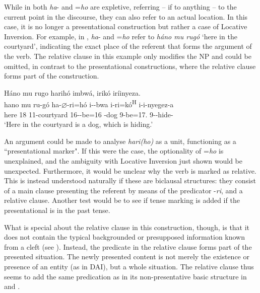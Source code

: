 \documentclass[output=paper]{langscibook}
\begin{document}
\z

While in  both \textit{ha}- and =\textit{ho} are expletive, referring – if to anything – to the current point in the discourse, they can also refer to an actual location. In this case, it is no longer a presentational construction but rather a case of Locative Inversion. For example, in , \textit{ha}- and =\textit{ho} refer to \textit{háno mu rugó} ‘here in the courtyard’, indicating the exact place of the referent that forms the argument of the verb. The relative clause in this example only modifies the NP and could be omitted, in contrast to the presentational constructions, where the relative clause forms part of the construction.\largerpage[2]

\ea
\label{bkm:Ref73366998}
Háno mu rugo harihó imbwá, irikó iríinyeza.\\
\gll
hano  mu  ru-gó  ha-$\varnothing$-ri=hó  i-\N-{}bwa  i-ri=kó\textsuperscript{H}   i-i-nyegez-a \\
here  18  11-courtyard  16\SM-\PRS-{}be=16  -{}dog  9\SM-{}be=17.\REL{}   9\SM-\REFL-{}hide-\FV{} \\
\glt
  ‘Here in the courtyard is a dog, which is hiding.’\\

\z

An argument could be made to analyse \textit{hari(ho)} as a unit, functioning as a ``presentational marker". If this were the case, the optionality of =\textit{ho} is unexplained, and the ambiguity with Locative Inversion just shown would be unexpected. Furthermore, it would be unclear why the verb is marked as relative. This is instead understood naturally if these are biclausal structures: they consist of a main clause presenting the referent by means of the predicator -\textit{ri}, and a relative clause. Another test would be to see if tense marking is added if the presentational is in the past tense.

What is special about the relative clause in this construction, though, is that it does not contain the typical backgrounded or presupposed information known from a cleft (see ). Instead, the predicate in the relative clause forms part of the presented situation. The newly presented content is not merely the existence or presence of an entity (as in DAI), but a whole situation. The relative clause thus seems to add the same predication as in its non-presentative basic structure in  and .
\end{document}
